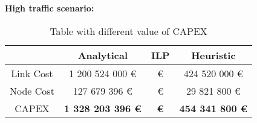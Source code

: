 \vspace{11pt}
\textbf{High traffic scenario:}\\

\begin{table}[h!]
\centering
\begin{tabular}{| c | c | c | c |}
 \hline
   & Analytical & ILP & Heuristic \\
 \hline\hline
 Link Cost & 1 200 524 000 \euro &  \euro & 424 520 000 \euro \\
 Node Cost & 127 679 396 \euro &  \euro & 29 821 800 \euro \\
 CAPEX & \textbf{1 328 203 396 \euro} & \textbf{ \euro} & \textbf{454 341 800 \euro} \\
 \hline
\end{tabular}
\caption{Table with different value of CAPEX }
\label{table_comparative_transp_protec_ref_3}
\end{table}


